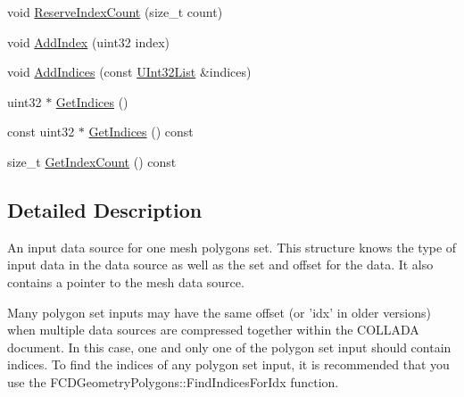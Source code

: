 \begin{DoxyCompactItemize}
\item 
void \hyperlink{classFCDGeometryPolygonsInput_adc1244ae383d74286b2cffda2cdf5273}{ReserveIndexCount} (size\_\-t count)
\item 
void \hyperlink{classFCDGeometryPolygonsInput_a7a0f9b2bd9a029dacb85dedf117be369}{AddIndex} (uint32 index)
\item 
void \hyperlink{classFCDGeometryPolygonsInput_aaeaf5df01bcea6367c4f871d83021db6}{AddIndices} (const \hyperlink{classfm_1_1vector}{UInt32List} \&indices)
\item 
uint32 $\ast$ \hyperlink{classFCDGeometryPolygonsInput_a5d7b1ca8bcb8b13f82068a081d58ee04}{GetIndices} ()
\item 
const uint32 $\ast$ \hyperlink{classFCDGeometryPolygonsInput_a1c3cb050c3fa5bc0b1a57b80fcbdc463}{GetIndices} () const 
\item 
size\_\-t \hyperlink{classFCDGeometryPolygonsInput_a9cee5af01dde8af915cc2e2b7ffba6e2}{GetIndexCount} () const 
\end{DoxyCompactItemize}


\subsection{Detailed Description}
An input data source for one mesh polygons set. This structure knows the type of input data in the data source as well as the set and offset for the data. It also contains a pointer to the mesh data source.

Many polygon set inputs may have the same offset (or 'idx' in older versions) when multiple data sources are compressed together within the COLLADA document. In this case, one and only one of the polygon set input should contain indices. To find the indices of any polygon set input, it is recommended that you use the FCDGeometryPolygons::FindIndicesForIdx function. 


